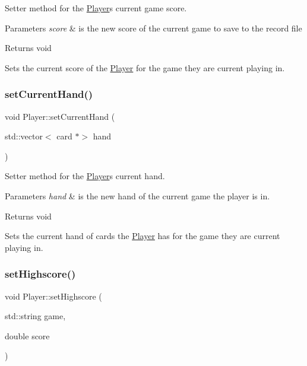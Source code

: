Setter method for the \mbox{\hyperlink{class_player}{Player}}\textquotesingle{}s current game score. 


\begin{DoxyParams}{Parameters}
{\em score} & is the new score of the current game to save to the record file \\
\hline
\end{DoxyParams}
\begin{DoxyReturn}{Returns}
void
\end{DoxyReturn}
Sets the current score of the \mbox{\hyperlink{class_player}{Player}} for the game they are current playing in. \mbox{\label{class_player_a8a4e0a62953bad66dd6dd18f28619ead}} 
\subsubsection{\texorpdfstring{set\+Current\+Hand()}{setCurrentHand()}}
{\footnotesize\ttfamily void Player\+::set\+Current\+Hand (\begin{DoxyParamCaption}\item[{std\+::vector$<$ card $\ast$$>$}]{hand }\end{DoxyParamCaption})}



Setter method for the \mbox{\hyperlink{class_player}{Player}}\textquotesingle{}s current hand. 


\begin{DoxyParams}{Parameters}
{\em hand} & is the new hand of the current game the player is in. \\
\hline
\end{DoxyParams}
\begin{DoxyReturn}{Returns}
void
\end{DoxyReturn}
Sets the current hand of cards the \mbox{\hyperlink{class_player}{Player}} has for the game they are current playing in. \mbox{\label{class_player_ae77a5ec07cea02f94c7c8bc9830e2521}} 
\subsubsection{\texorpdfstring{set\+Highscore()}{setHighscore()}}
{\footnotesize\ttfamily void Player\+::set\+Highscore (\begin{DoxyParamCaption}\item[{std\+::string}]{game,  }\item[{double}]{score }\end{DoxyParamCaption})}



